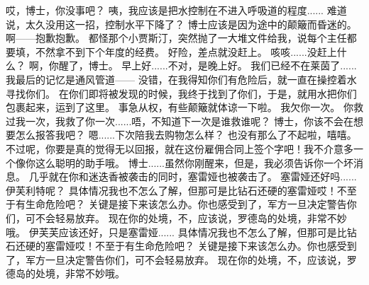 \documentclass[openany]{book}
\begin{document}
\begin{dialogue}
     哎，博士，你没事吧？
     咦，我应该是把水控制在不进入呼吸道的程度......
     难道说，太久没用这一招，控制水平下降了？
     博士应该是因为途中的颠簸而昏迷的。
     啊——抱歉抱歉。
     都怪那个小贾斯汀，突然抛了一大堆文件给我，说每个主任都要填，不然拿不到下个年度的经费。
     好险，差点就没赶上。
     咳咳......没赶上什么？
     啊，你醒了，博士。
     早上好......不对，是晚上好。
     我们已经不在莱茵了......我最后的记忆是通风管道——
     没错，在我得知你们有危险后，就一直在操控着水寻找你们。
     在你们即将被发现的时候，我终于找到了你们，于是，就用水把你们包裹起来，运到了这里。
     事急从权，有些颠簸就体谅一下啦。
     我欠你一次。
     你救过我一次，我救了你一次......唔，不知道下一次是谁救谁呢？
     博士，你该不会在想要怎么报答我吧？
     嗯......下次陪我去购物怎么样？
     也没有那么了不起啦，嘻嘻。
     不过呢，你要是真的觉得无以回报，就在这份雇佣合同上签个字吧！我不介意多一个像你这么聪明的助手哦。
     博士......虽然你刚醒来，但是，我必须告诉你一个坏消息。
     几乎就在你和迷迭香被袭击的同时，塞雷娅也被袭击了。
     塞雷娅还好吗......伊芙利特呢？
     具体情况我也不怎么了解，但那可是比钻石还硬的塞雷娅哎！不至于有生命危险吧？
     关键是接下来该怎么办。你也感受到了，军方一旦决定警告你们，可不会轻易放弃。
     现在你的处境，不，应该说，罗德岛的处境，非常不妙哦。
     伊芙芙应该还好，只是塞雷娅......
     具体情况我也不怎么了解，但那可是比钻石还硬的塞雷娅哎！不至于有生命危险吧？
     关键是接下来该怎么办。你也感受到了，军方一旦决定警告你们，可不会轻易放弃。
     现在你的处境，不，应该说，罗德岛的处境，非常不妙哦。
\end{dialogue}
\end{document}
